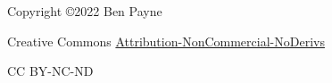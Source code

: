 \thispagestyle{empty}

Copyright \copyright 2022 Ben Payne

Creative Commons \href{https://creativecommons.org/licenses/by-nc-nd/4.0/}{Attribution-NonCommercial-NoDerivs}

CC BY-NC-ND
